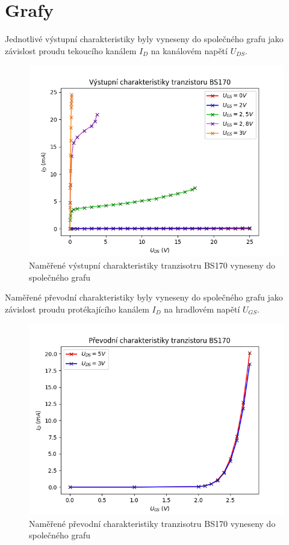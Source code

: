 \documentclass[a4paper, czech]{article}
\begin{document}
\pagebreak

\section{Grafy}

Jednotlivé výstupní charakteristiky byly vyneseny do společného grafu jako závislost proudu tekoucího kanálem $I_D$ na kanálovém napětí $U_{DS}$.

\begin{figure}[H]
    \centering
    \includegraphics[width=\textwidth]{vystupni.png}
    \caption{Naměřené výstupní charakteristiky tranzisotru BS170 vyneseny do společného grafu}
\end{figure}

\pagebreak

Naměřené převodní charakteristiky byly vyneseny do společného grafu jako závislost proudu protékajícího kanálem $I_D$ na hradlovém napětí $U_{GS}$.

\begin{figure}[H]
    \centering
    \includegraphics{prevodni.png}
    \caption{Naměřené převodní charakteristiky tranzisotru BS170 vyneseny do společného grafu}
\end{figure}
\end{document}
